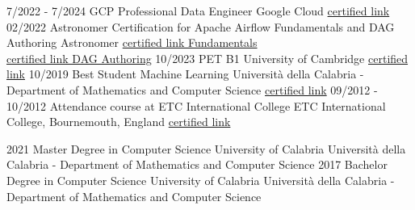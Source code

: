 \documentclass[9pt]{developercv} %
\begin{document}

    \vspace{-10 pt}
    \begin{entrylist}
        \entry
        {7/2022 - 7/2024}
        {GCP Professional Data Engineer }
        {Google Cloud}
        {\href{https://europa.eu/europass/eportfolio/screen/redirect-external?url=https://www.credential.net/470d1fe8-1a20-41af-961f-096835a17255}{certified link}}
        \entry
        {02/2022}
        {Astronomer Certification for Apache Airflow Fundamentals and DAG Authoring}
        {Astronomer}
        {\href{https://europa.eu/europass/eportfolio/screen/redirect-external?url=https://www.credly.com/badges/f424a105-4f82-4de6-91bf-70a299052e09/public_url}{certified link Fundamentals}\\
        \href{https://europa.eu/europass/eportfolio/screen/redirect-external?url=https://www.credly.com/badges/1f1da504-b57b-48d7-8072-fef4f4986b63/public_url}{certified link DAG Authoring}}
        \entry
        {10/2023}
        {PET B1}
        {University of Cambridge}
        {{\href{https://europa.eu/europass/eportfolio/screen/redirect-external?url=https://www.icloud.com/iclouddrive/0NFIiSrsMi3tyW8ZlZu8LOw-A#pet}{certified link}}}
        \entry
        {10/2019}
        {Best Student Machine Learning}
        {Università della Calabria - Department of Mathematics and Computer Science}
        {{\href{https://europa.eu/europass/eportfolio/screen/redirect-external?url=https://www.icloud.com/iclouddrive/04QwjtTu42vB1e1-0HA5CC-mg#bs_machine_learning}{certified link}}}
        \entry
        {09/2012 - 10/2012}
        {Attendance course at ETC International College}
        {ETC International College, Bournemouth, England}
        {{\href{https://europa.eu/europass/eportfolio/screen/redirect-external?url=https://www.icloud.com/iclouddrive/0z_FGaHDIwb5aYkfD03TKBF1Q#ETC_certified link}{certified link}}}
    \end{entrylist}
    \vspace{-10 pt}
    \begin{entrylist}
        \entry
        {2021}
        {Master Degree in Computer Science}
        {University of Calabria}
        {Università della Calabria - Department of Mathematics and Computer Science}
        \entry
        {2017}
        {Bachelor Degree in Computer Science}
        {University of Calabria}
        {Università della Calabria - Department of Mathematics and Computer Science}
    \end{entrylist}
\end{document}
